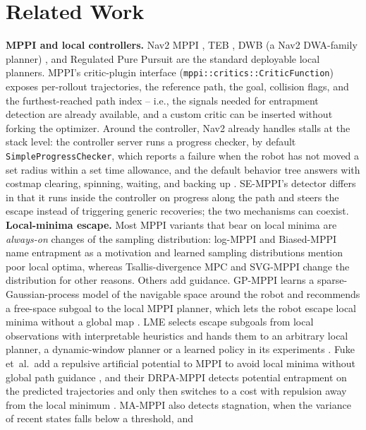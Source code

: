 \documentclass[journal]{IEEEtran}
\begin{document}
\section{Related Work}
\label{sec:related}

\textbf{MPPI and local controllers.} Nav2 MPPI \cite{nav2,mppi_orig}, TEB
\cite{teb}, DWB (a Nav2 DWA-family planner) \cite{dwa}, and Regulated Pure
Pursuit \cite{rpp} are the standard deployable local planners. MPPI's
critic-plugin interface (\texttt{mppi::critics::CriticFunction}) exposes
per-rollout trajectories, the reference path, the goal, collision flags,
and the furthest-reached path index -- i.e., the signals needed for
entrapment detection are already available, and a custom critic can be
inserted without forking the optimizer. Around the controller, Nav2
already handles stalls at the stack level: the controller server runs a
progress checker, by default \texttt{SimpleProgressChecker}, which reports
a failure when the robot has not moved a set radius within a set time
allowance, and the default behavior tree answers with costmap clearing,
spinning, waiting, and backing up \cite{nav2_progress,nav2_bt}. SE-MPPI's
detector differs in that it runs inside the controller on progress along
the path and steers the escape instead of triggering generic recoveries;
the two mechanisms can coexist. 
\textbf{Local-minima escape.} Most MPPI variants that bear on local minima
are \emph{always-on} changes of the sampling distribution: log-MPPI
\cite{log_mppi} and Biased-MPPI \cite{biased_mppi} name entrapment as a
motivation and learned sampling distributions \cite{flow_mppi} mention poor
local optima, whereas Tsallis-divergence MPC \cite{tsallis_mppi} and
SVG-MPPI \cite{svg_mppi} change the distribution for other reasons. Others
add guidance. GP-MPPI learns a sparse-Gaussian-process model of the
navigable space around the robot and recommends a free-space subgoal to
the local MPPI planner, which lets the robot escape local minima without a
global map \cite{gp_mppi}. LME selects escape subgoals from local
observations with interpretable heuristics and hands them to an arbitrary
local planner, a dynamic-window planner or a learned policy in its
experiments \cite{lme}. Fuke et~al.\ add a repulsive artificial
potential to MPPI to avoid local minima without global path guidance
\cite{drpa_sii}, and their DRPA-MPPI detects potential entrapment on the
predicted trajectories and only then switches to a cost with repulsion
away from the local minimum \cite{drpa_mppi}. MA-MPPI also detects
stagnation, when the variance of recent states falls below a threshold, and
\end{document}

